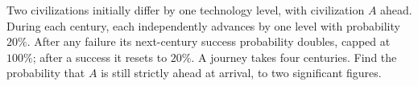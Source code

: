 Two civilizations initially differ by one technology level, with civilization $A$ ahead. During each century, each independently advances by one level with probability $20\%$. After any failure its next-century success probability doubles, capped at $100\%$; after a success it resets to $20\%$. A journey takes four centuries. Find the probability that $A$ is still strictly ahead at arrival, to two significant figures.
